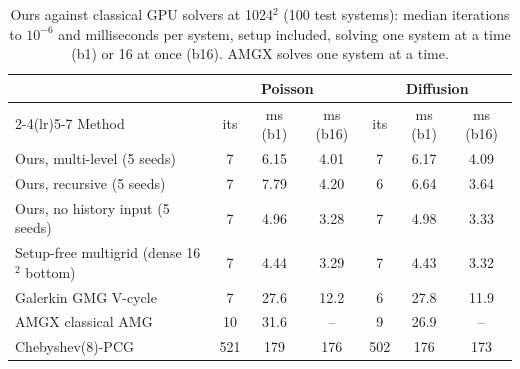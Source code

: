 \begin{table}[t]
\centering
\footnotesize
\caption{Ours against classical GPU solvers at 1024$^2$ (100 test systems): median iterations to $10^{-6}$ and milliseconds per system, setup included, solving one system at a time (b1) or 16 at once (b16). AMGX solves one system at a time.}
\label{tab:classical}
\begin{tabular}{lcccccc}
\toprule
& \multicolumn{3}{c}{Poisson} & \multicolumn{3}{c}{Diffusion} \\
\cmidrule(lr){2-4}\cmidrule(lr){5-7}
Method & its & ms (b1) & ms (b16) & its & ms (b1) & ms (b16) \\
\midrule
Ours, multi-level (5 seeds) & 7 & 6.15 & 4.01 & 7 & 6.17 & 4.09 \\
Ours, recursive (5 seeds) & 7 & 7.79 & 4.20 & 6 & 6.64 & 3.64 \\
Ours, no history input (5 seeds) & 7 & 4.96 & 3.28 & 7 & 4.98 & 3.33 \\
Setup-free multigrid (dense 16$^2$ bottom) & 7 & 4.44 & 3.29 & 7 & 4.43 & 3.32 \\
Galerkin GMG V-cycle & 7 & 27.6 & 12.2 & 6 & 27.8 & 11.9 \\
AMGX classical AMG & 10 & 31.6 & -- & 9 & 26.9 & -- \\
Chebyshev(8)-PCG & 521 & 179 & 176 & 502 & 176 & 173 \\
\bottomrule
\end{tabular}
\end{table}
